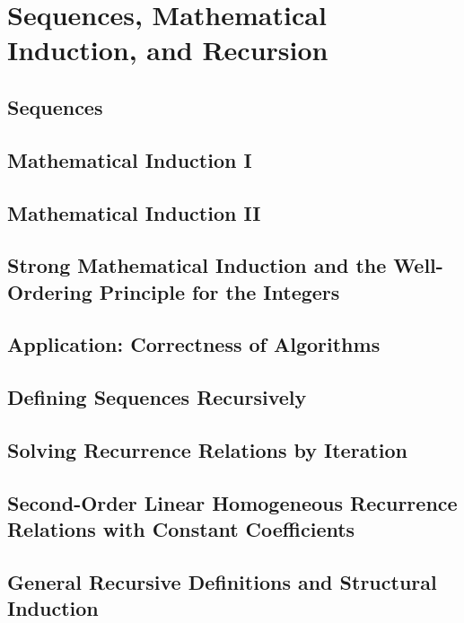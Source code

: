 \section{Sequences, Mathematical Induction, and Recursion}

\subsection{Sequences}

\subsection{Mathematical Induction I}


\subsection{Mathematical Induction II}


\subsection{Strong Mathematical Induction and the Well-Ordering Principle for the Integers}


\subsection{Application: Correctness of Algorithms}


\subsection{Defining Sequences Recursively}


\subsection{Solving Recurrence Relations by Iteration}


\subsection{Second-Order Linear Homogeneous Recurrence Relations with Constant Coefficients}


\subsection{General Recursive Definitions and Structural Induction}